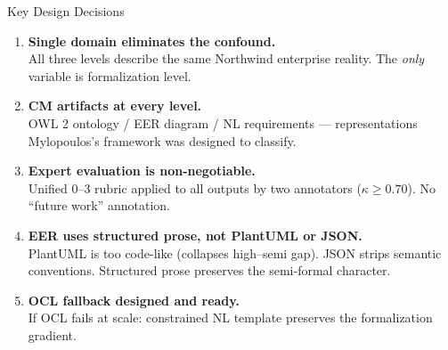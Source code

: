 \documentclass[aspectratio=169]{beamer}
\begin{document}
\begin{frame}{Key Design Decisions}

\begin{enumerate}
    \item \textbf{Single domain eliminates the confound.}\\
    All three levels describe the same Northwind enterprise reality. The \emph{only} variable is formalization level.

    \vspace{0.5em}
    \item \textbf{CM artifacts at every level.}\\
    OWL 2 ontology / EER diagram / NL requirements --- representations Mylopoulos's framework was designed to classify.

    \vspace{0.5em}
    \item \textbf{Expert evaluation is non-negotiable.}\\
    Unified 0--3 rubric applied to all outputs by two annotators ($\kappa \geq 0.70$). No ``future work'' annotation.

    \vspace{0.5em}
    \item \textbf{EER uses structured prose, not PlantUML or JSON.}\\
    PlantUML is too code-like (collapses high--semi gap). JSON strips semantic conventions. Structured prose preserves the semi-formal character.

    \vspace{0.5em}
    \item \textbf{OCL fallback designed and ready.}\\
    If OCL fails at scale: constrained NL template preserves the formalization gradient.
\end{enumerate}

\end{frame}
\end{document}
